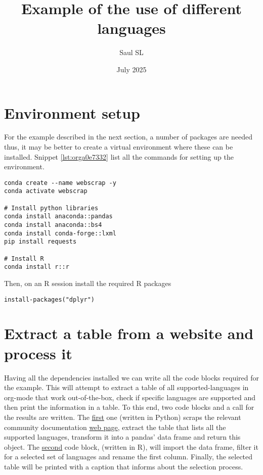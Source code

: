 \documentclass[11pt]{article}
\author{Saul SL}
\date{July 2025}
\title{Example of the use of different languages}
\begin{document}
\maketitle
\tableofcontents

\section{Environment setup}
\label{sec:orge692078}
For the example described in the next section,  a number of packages are needed thus, it may be better to create a virtual environment where these can be installed. Snippet \ref{lst:orga0e7332} list all the commands for setting up the environment.

\begin{verbatim}
conda create --name webscrap -y
conda activate webscrap

# Install python libraries
conda install anaconda::pandas
conda install anaconda::bs4
conda install conda-forge::lxml
pip install requests

# Install R
conda install r::r
\end{verbatim}

Then, on an R session install the required R packages

\begin{verbatim}
install-packages("dplyr")
\end{verbatim}
\section{Extract a table from a website and process it}
\label{sec:org244b15f}
Having all the dependencies installed we can write all the code blocks required for the example. This will attempt to extract a table of all supported-languages  in org-mode that work out-of-the-box, check if specific languages are supported and then print the information in a table. To this end, two code blocks  and a call for the results are written.  The \hyperref[lst:org498de64]{first} one (written in Python) scraps  the relevant community documentation \href{https://orgmode.org/worg/org-contrib/babel/languages/}{web page}, extract the  table that lists all the supported languages, transform it into a pandas' data frame and return this object. The \hyperref[tab:org4560ce1]{second} code block, (written in R), will import the data frame, filter it for a selected set of languages and rename the first column. Finally, the selected table will be printed with a caption that informs about the selection process.
\end{document}
